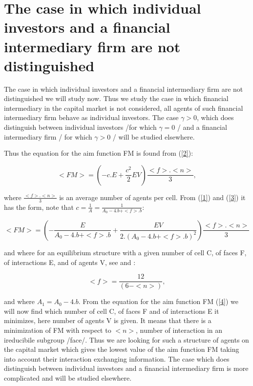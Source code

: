 \documentclass[10pt]{article}
\begin{document}
\section{The case in which individual investors and a financial intermediary firm are not distinguished}

The case in which individual investors and a financial intermediary firm are not distinguished we will study now. Thus we study the case in which financial intermediary in the capital market is not considered, all agents of such financial intermediary firm behave as individual investors. The case $\gamma > 0$, which does distinguish between individual investors /for which $\gamma = 0$ / and a financial intermediary firm / for which $\gamma > 0$ / will be studied elsewhere.

Thus the equation for the aim function FM is found from (\ref{2}):

\begin{equation}
\label{3}
<FM> = (- c.E + \frac{c^{2}}{2}EV)\frac{<f>.<n>}{3},
\end{equation}

where $\frac{<f>.<n>}{3}$ is an average number of agents per cell. From (\ref{1}) and (\ref{3}) it has the form, note that $c = \frac{1}{A} = \frac{1}{A_{0} - 4.b + <f>.b}$:

\begin{equation}
\label{4}
<FM> = (- \frac{E}{A_{0} - 4.b + <f>.b} + \frac{EV}{2.(A_{0} - 4.b + <f>.b)^{2}})\frac{<f>.<n>}{3}
\end{equation}


and where for an equilibrium structure with a given number of cell C, of faces F, of interactions E, and of agents V, see \cite{3} and \cite{4}:

\begin{equation}
\label{5}
<f>= \frac{12}{(6-<n>)},
\end{equation}

and where $A_{1} = A_{0} - 4.b$. From the equation for the aim function FM (\ref{4}) we will now find which number of cell C, of faces F and of interactions E it minimizes, here number of agents V is given. It means that there is a minimization of FM with respect to $<n>$, number of interaction in an ireducibile subgroup /face/. Thus we are looking for such a structure of agents on the capital market which gives the lowest value of the aim function FM taking into account their interaction exchanging information. The case which does distinguish between individual investors and a financial intermediary firm is more complicated and will be studied elsewhere.
\end{document}
